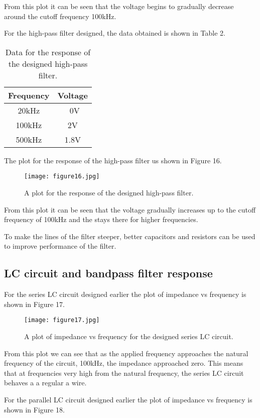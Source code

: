 \documentclass[12pt]{article}
\begin{document}
From this plot it can be seen that the voltage begins to gradually
decrease around the cutoff frequency 100kHz.

For the high-pass filter designed, the data obtained is shown in Table
2.
\begin {table}[!h]
\center
\begin {tabular}{|c|c|}
\hline
Frequency     &     Voltage  \\
\hline
20kHz         &     ~0V      \\
\hline
100kHz        &     2V     \\
\hline
500kHz        &     1.8V    \\
\end {tabular}
\caption { Data for the response of the designed high-pass filter.}
\label {Table.2}
\end {table}
The plot for the response of the high-pass filter us shown in Figure 16.
\begin {figure}[!h]
\centering
\texttt{[image: figure16.jpg]}
\caption{\label{rvd} A plot for the response of the designed high-pass filter.}
\end {figure}

From this plot it can be seen that the voltage gradually increases up to
the cutoff frequency of 100kHz and the stays there for higher
frequencies. 

To make the lines of the filter steeper, better capacitors and resistors
can be used to improve performance of the filter.

\subsection {LC circuit and bandpass filter response}
For the series LC circuit designed earlier the plot of impedance vs
frequency is shown in Figure 17.

\begin {figure}[!h]
\centering
\texttt{[image: figure17.jpg]}
\caption{\label{rvd} A plot of impedance vs frequency for the designed
series LC circuit.}
\end {figure}

From this plot we can see that as the applied frequency approaches the
natural frequency of the circuit, 100kHz, the impedance approached
zero. This means that at frequencies very high from the natural
frequency, the series LC circuit behaves a a regular a wire.

For the parallel LC circuit designed earlier the plot of impedance vs
frequency is shown in Figure 18.
\end{document}
